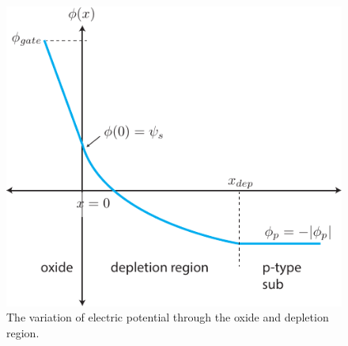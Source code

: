 \newpage
\begin{figure}[t]
\centering
\includegraphics[width=.85\columnwidth]{MOS_potential}
\caption{The variation of electric potential through the oxide and depletion region.} \label{fig:MOS_potential}
\end{figure}
